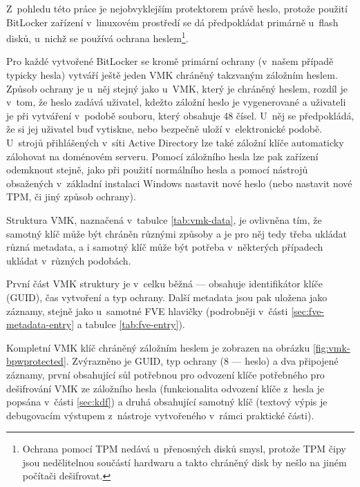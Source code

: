 Z~pohledu této práce je nejobvyklejším protektorem právě heslo, protože použití BitLocker zařízení v~linuxovém prostředí se dá předpokládat primárně u~flash disků, u~nichž se používá ochrana heslem\footnote{Ochrana pomocí TPM nedává u~přenosných disků smysl, protože TPM čipy jsou nedělitelnou součástí hardwaru a takto chráněný disk by nešlo na jiném počítači dešifrovat.}.

Pro každé vytvořené BitLocker se kromě primární ochrany (v~našem případě typicky hesla) vytváří ještě jeden VMK chráněný takzvaným záložním heslem. Způsob ochrany je u~něj stejný jako u~VMK, který je chráněný heslem, rozdíl je v~tom, že heslo zadává uživatel, kdežto záložní heslo je vygenerované a uživateli je při vytváření  v~podobě souboru, který obsahuje 48 čísel. U~něj se předpokládá, že si jej uživatel buď vytiskne, nebo bezpečně uloží v~elektronické podobě. U~strojů přihlášených v~síti Active Directory lze také záložní klíče automaticky zálohovat na doménovém serveru. Pomocí záložního hesla lze pak zařízení odemknout stejně, jako při použití normálního hesla a pomocí nástrojů obsažených v~základní instalaci Windows nastavit nové heslo (nebo nastavit nové TPM, či jiný způsob ochrany).\cite{Hall2019,MS2011}

Struktura VMK, naznačená v~tabulce \ref{tab:vmk-data}, je ovlivněna tím, že samotný klíč může být chráněn různými způsoby a je pro něj tedy třeba ukládat různá metadata, a i samotný klíč může být potřeba v~některých případech ukládat v~různých podobách.

První část VMK struktury je v~celku běžná --- obsahuje identifikátor klíče (GUID), čas vytvoření a typ ochrany. Další metadata jsou pak uložena jako záznamy, stejně jako u~samotné FVE hlavičky (podrobněji v~části \ref{sec:fve-metadata-entry} a tabulce \ref{tab:fve-entry}).


Kompletní VMK klíč chráněný záložním heslem je zobrazen na obrázku \ref{fig:vmk-bpwprotected}. Zvý\-raz\-ně\-no je GUID, typ ochrany (8 --- heslo) a dva připojené záznamy, první obsahující sůl potřebnou pro odvození klíče potřebného pro dešifrování VMK ze záložního hesla (funkcionalita odvození klíče z~hesla je popsána v~části \ref{sec:kdf}) a druhá obsahující samotný klíč (textový výpis je debugovacím výstupem z~nástroje vytvořeného v~rámci praktické části).

